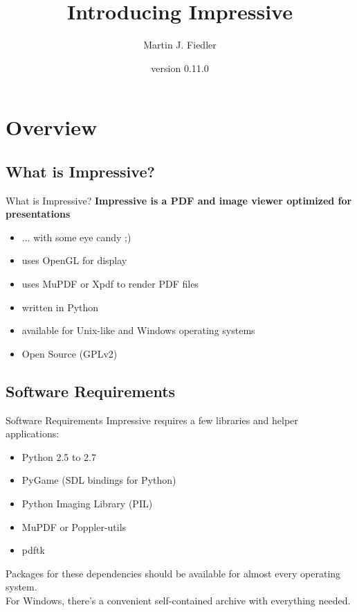 \documentclass[bigger,hyperref={colorlinks=true,linkcolor=white,urlcolor=blue}]{beamer}
\title{Introducing Impressive}
\author{Martin J. Fiedler}
\date{version 0.11.0}
\begin{document}
\maketitle


\section{Overview}

\subsection{What is Impressive?}
\begin{frame}{What is Impressive?}
    \large
    \textbf{Impressive is a PDF and image viewer optimized for presentations}
    \normalsize
    \begin{itemize}
        \item ... with some eye candy ;)
        \item uses OpenGL for display
        \item uses MuPDF or Xpdf to render PDF files
        \item written in Python
        \item available for Unix-like and Windows operating systems
        \item Open Source (GPLv2)
    \end{itemize}
\end{frame}

\subsection{Software Requirements}
\begin{frame}{Software Requirements}
    Impressive requires a few libraries and helper applications:
    \begin{itemize}
        \item Python 2.5 to 2.7
        \item PyGame (SDL bindings for Python)
        \item Python Imaging Library (PIL)
        \item MuPDF or Poppler-utils
        \item pdftk
    \end{itemize}
    Packages for these dependencies should be available for almost every
    operating system. \\
    For Windows, there's a convenient self-contained archive with
    everything needed.
\end{frame}
\end{document}
